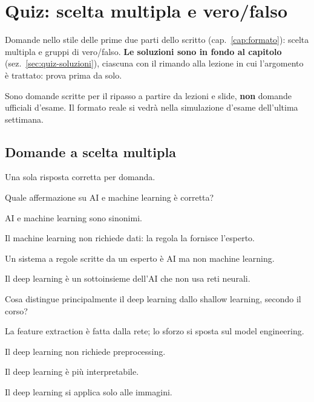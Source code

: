\chapter{Quiz: scelta multipla e vero/falso}
\label{cap:quiz}
\setcounter{domanda}{0}

Domande nello stile delle prime due parti dello scritto (cap.~\ref{cap:formato}): scelta multipla e
gruppi di vero/falso. \textbf{Le soluzioni sono in fondo al capitolo} (sez.~\ref{sec:quiz-soluzioni}),
ciascuna con il rimando alla lezione in cui l'argomento è trattato: prova prima da solo.

\begin{nota}
Sono domande scritte per il ripasso a partire da lezioni e slide, \textbf{non} domande ufficiali
d'esame. Il formato reale si vedrà nella simulazione d'esame dell'ultima settimana.
\end{nota}

\section{Domande a scelta multipla}
Una sola risposta corretta per domanda.

\begin{domanda}[AI e ML]\label{quiz:m1}
Quale affermazione su AI e machine learning è corretta?
\begin{opzioni}
  \item AI e machine learning sono sinonimi.
  \item Il machine learning non richiede dati: la regola la fornisce l'esperto.
  \item Un sistema a regole scritte da un esperto è AI ma non machine learning.
  \item Il deep learning è un sottoinsieme dell'AI che non usa reti neurali.
\end{opzioni}
\end{domanda}

\begin{domanda}\label{quiz:m2}
Cosa distingue principalmente il deep learning dallo shallow learning, secondo il corso?
\begin{opzioni}
  \item La feature extraction è fatta dalla rete; lo sforzo si sposta sul model engineering.
  \item Il deep learning non richiede preprocessing.
  \item Il deep learning è più interpretabile.
  \item Il deep learning si applica solo alle immagini.
\end{opzioni}
\end{domanda}

